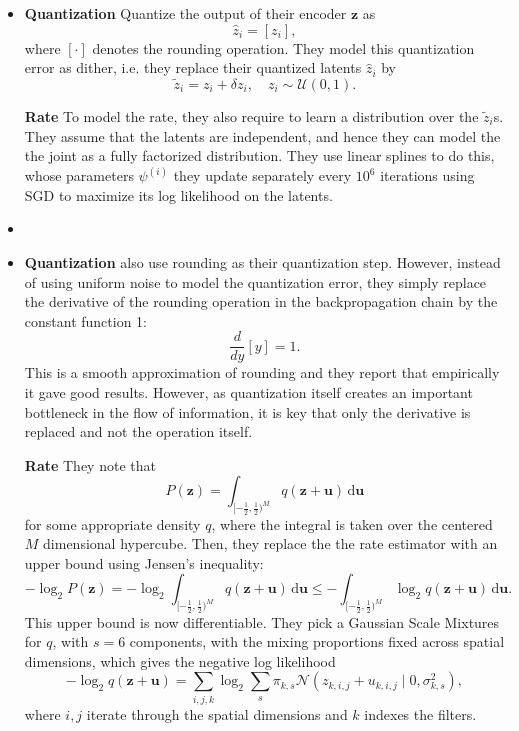 \documentclass{article}
\renewcommand{\vec}[1]{\mathbf{#1}}
\renewcommand{\d}{\,\text{d}}
\newcommand{\Norm}{\mathcal{N}}
\newcommand{\Unif}{\mathcal{U}}
\begin{document}
\begin{itemize}
\item
  \textbf{Quantization }
  \cite{balle2016end} Quantize the output of their encoder $\vec{z}$ as
  \[
    \hat{z}_i = [z_i], 
  \]
  where $[\cdot]$ denotes the rounding operation. They model this 
  quantization error as dither, i.e. they replace their quantized latents
  $\hat{z}_i$ by
  \[
    \tilde{z}_i = z_i + \delta z_i, \quad z_i \sim \Unif(0, 1). 
  \]
  \par \textbf{Rate }
  To model the rate, they also require to learn a distribution over the
  $\tilde{z}_i$s. They assume that the latents are independent, and hence they
  can model the the joint as a fully factorized distribution. They use linear
  splines to do this, whose parameters $\psi^{(i)}$ they update separately every
  $10^6$ iterations using SGD to maximize its log likelihood on the latents.

\item \cite{toderici2017full}
\item
  \textbf{Quantization }
  \cite{theis2017lossy} also use rounding as their quantization step.
  However, instead of using uniform noise to model the quantization error, they
  simply replace the derivative of the rounding operation in the backpropagation
  chain by the constant function 1:
  \[
    \frac{d}{d y} [y] = 1.
  \]
  This is a smooth approximation of rounding and they report that empirically it
  gave good results. However, as quantization itself creates an important
  bottleneck in the flow of information, it is key that only the derivative is
  replaced and not the operation itself.
  \par \textbf{Rate }
  They note that
  \[
    P(\vec{z}) = \int_{[-\frac{1}{2}, \frac{1}{2})^M} q(\vec{z} + \vec{u}) \d \vec{u}
  \]
  for some appropriate density $q$,
  where the integral is taken over the centered $M$ dimensional hypercube.
  Then, they replace the the rate estimator with an upper bound using Jensen's
  inequality:
  \[
    -\log_2P(\vec{z}) = -\log_2\int_{[-\frac{1}{2}, \frac{1}{2})^M} q(\vec{z} +
    \vec{u}) \d \vec{u} \leq -\int_{[-\frac{1}{2}, \frac{1}{2})^M} \log_2q(\vec{z} +
    \vec{u}) \d \vec{u}.
  \]
  This upper bound is now differentiable. They pick a Gaussian Scale Mixtures for
  $q$, with $s = 6$ components, with the mixing proportions fixed across spatial
  dimensions, which gives the negative log likelihood
  \[
    -\log_2 q(\vec{z} + \vec{u}) =
    \sum_{i, j, k} \log_2 \sum_s \pi_{k, s} \Norm(z_{k,i,j} + u_{k, i, j} \mid
    0, \sigma_{k, s}^2),
  \]
  where $i,j$ iterate through the spatial dimensions and $k$ indexes the filters.
  

\end{itemize}
\end{document}
